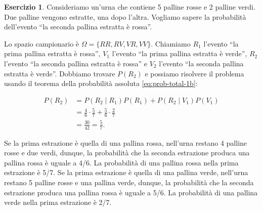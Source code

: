 \documentclass[
  11pt,
]{krantz}
\theoremstyle{definition}
\theoremstyle{definition}
\theoremstyle{definition}
\newtheorem{exercise}{Esercizio}[chapter]
\theoremstyle{definition}
\theoremstyle{remark}
\begin{document}
\begin{exercise}
Consideriamo un'urna che contiene 5 palline rosse e 2 palline verdi. Due palline vengono estratte, una dopo l'altra. Vogliamo sapere la probabilità dell'evento ``la seconda pallina estratta è rossa''.

Lo spazio campionario è \(\Omega = \{RR, RV, VR, VV\}\). Chiamiamo \(R_1\) l'evento ``la prima pallina estratta è rossa'', \(V_1\) l'evento ``la prima pallina estratta è verde'', \(R_2\) l'evento ``la seconda pallina estratta è rossa'' e \(V_2\) l'evento ``la seconda pallina estratta è verde''. Dobbiamo trovare \(P(R_2)\) e possiamo risolvere il problema usando il teorema della probabilità assoluta \eqref{eq:prob-total-1b}:

\[
\begin{split}
P(R_2) &= P(R_2 \mid R_1) P(R_1) + P(R_2 \mid V_1)P(V_1)\\
&= \frac{4}{6} \cdot \frac{5}{7} + \frac{5}{6} \cdot \frac{2}{7} \\
&= \frac{30}{42} = \frac{5}{7}.
\end{split}
\]

Se la prima estrazione è quella di una pallina rossa, nell'urna restano 4 palline rosse e due verdi, dunque, la probabilità che la seconda estrazione produca una pallina rossa è uguale a 4/6. La probabilità di una pallina rossa nella prima estrazione è 5/7. Se la prima estrazione è quella di una pallina verde, nell'urna restano 5 palline rosse e una pallina verde, dunque, la probabilità che la seconda estrazione produca una pallina rossa è uguale a 5/6. La probabilità di una pallina verde nella prima estrazione è 2/7.
\end{exercise}

  

\printindex
\end{document}
